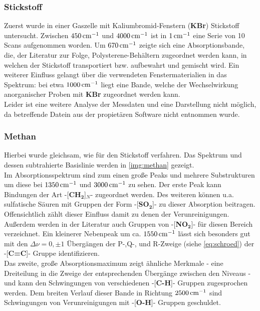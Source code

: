 \documentclass[numbers=noenddot,a4paper,10pt,twocolumn]{article}
\newcommand{\fett}[1]{\textbf{#1}}
\begin{document}
		\subsubsection*{Stickstoff}
		Zuerst wurde in einer Gaszelle mit Kaliumbromid-Fenstern (\fett{KBr}) Stickstoff untersucht. Zwischen $\unit[450]{cm^{-1}}$ und $\unit[4000]{cm^{-1}}$ ist in $\unit[1]{cm^{-1}}$ eine Serie von 10 Scans aufgenommen worden. Um $\unit[670]{cm^{-1}}$ zeigte sich eine Absorptionsbande, die, der Literatur zur Folge, Polysterene-Beh\"altern zugeordnet werden kann, in welchen der Stickstoff transportiert bzw. aufbewahrt und gemischt wird. Ein weiterer Einfluss gelangt \"uber die verwendeten Fenstermaterialien in das Spektrum: bei etwa $\unit[1000]{cm^{-1}}$  liegt eine Bande, welche der Wechselwirkung anorganischer Proben mit \fett{KBr} zugeordnet werden kann.\\
		Leider ist eine weitere Analyse der Messdaten und eine Darstellung nicht m\"oglich, da betreffende Datein aus der propiet\"aren Software nicht entnommen wurde.
		
		\subsubsection*{Methan}
		Hierbei wurde gleichsam, wie f\"ur den Stickstoff verfahren. Das Spektrum und dessen subtrahierte Basislinie werden in \autoref{img:methan} gezeigt.\\
		Im Absorptionsspektrum sind zum einen gro{\ss}e Peaks und mehrere Substrukturen um diese bei $\unit[1350]{cm^{-1}}$ und $\unit[3000]{cm^{-1}}$ zu sehen. Der erste Peak kann Bindungen der Art -[\fett{CH}$_{\fett{2}}$]$_{N}$- zugeordnet werden. Des weiteren k\"onnen  u.a. sulfatische S\"auren mit Gruppen der Form -[\fett{SO}$_{\fett{2}}$]- zu dieser Absorption beitragen. Offensichtlich z\"ahlt dieser Einfluss damit zu denen der Verunreinigungen. Au{\ss}erdem werden in der Literatur auch Gruppen von -[\fett{NO}$_{\fett{2}}$]- f\"ur diesen Bereich verzeichnet. Ein kleinerer Nebenpeak um ca. $\unit[1550]{cm^{-1}}$ l\"asst sich besonders gut mit den $\Delta\nu=0,\pm1$ \"Uberg\"angen der P-,Q-, und R-Zweige (siehe \autoref{eq:schroed}) der -[\fett{C=C}]- Gruppe identifizieren.\\
		Das zweite, gro{\ss}e Absorptionsmaximum zeigt \"ahnliche Merkmale - eine Dreiteilung in die Zweige der entsprechenden \"Uberg\"ange zwischen den Niveaus - und kann den Schwingungen von verschiedenen -[\fett{C-H}]- Gruppen zugesprochen werden. Dem breiten Verlauf dieser Bande in Richtung $\unit[2500]{cm^{-1}}$ sind Schwingungen von Verunreinigungen mit -[\fett{O-H}]- Gruppen geschuldet.
\end{document}
